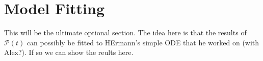 \section{Model Fitting}

This will be the ultimate optional section. The idea here is that the results of $\mathcal{P}(t)$ can possibly be fitted to HErmann's simple ODE that he worked on (with Alex?). If so we can show the reults here. 
